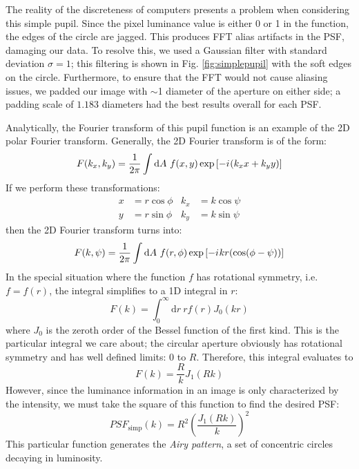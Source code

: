 \documentclass[%
 reprint,
 amsmath,amssymb,
 aps,
 pra,
]{revtex4-1}
\newcommand{\D}{\mathrm{d}}
\newcommand{\iu}{{i\mkern1mu}}
\begin{document}
{The reality of the discreteness of computers presents a problem when considering this simple pupil. Since the pixel luminance value is either 0 or 1 in the function, the edges of the circle are jagged. This produces FFT alias artifacts in the PSF, damaging our data. To resolve this, we used a Gaussian filter with standard deviation $\sigma = 1$; this filtering is shown in Fig. \ref{fig:simplepupil} with the soft edges on the circle. Furthermore, to ensure that the FFT would not cause aliasing issues, we padded our image with $\sim$1 diameter of the aperture on either side; a padding scale of $1.183$ diameters had the best results overall for each PSF.

Analytically, the Fourier transform of this pupil function is an example of the 2D polar Fourier transform. Generally, the 2D Fourier transform is of the form:
\begin{equation}
  F(k_x, k_y) = \frac{1}{2\pi}\int\D A\ f(x, y)\exp\left[-\iu(k_x x + k_y y)\right] \label{eq:2dfourier}
\end{equation}
If we perform these transformations:
\begin{align*}
  x &= r\cos\phi & k_x &= k\cos\psi \\
  y &= r\sin\phi & k_y &= k\sin\psi
\end{align*}
then the 2D Fourier transform turns into:
\begin{equation}
  F(k, \psi) = \frac{1}{2\pi}\int\D A\ f(r, \phi)\exp\left[-\iu kr(\cos(\phi - \psi))\right] \label{eq:2dpolarfourier}
\end{equation}
In the special situation where the function $f$ has rotational symmetry, i.e. $f=f(r)$, the integral simplifies to a 1D integral in $r$:
\begin{equation}
  F(k) = \int_0^{\infty}\D r\ r f(r)J_0(kr) \label{eq:2dpolarfouriersym}
\end{equation}
where $J_0$ is the zeroth order of the Bessel function of the first kind. This is the particular integral we care about; the circular aperture obviously has rotational symmetry and has well defined limits: 0 to $R$. Therefore, this integral evaluates to
\begin{equation*}
  F(k) = \frac{R}{k}J_1(R k)
\end{equation*}
However, since the luminance information in an image is only characterized by the intensity, we must take the square of this function to find the desired PSF:
\begin{equation}
  PSF_{\text{simp}}(k) = R^2 \left(\frac{J_1(R k)}{k}\right)^2 \label{eq:psf-simp}
\end{equation}
This particular function generates the \textit{Airy pattern}, a set of concentric circles decaying in luminosity.

}
\end{document}
